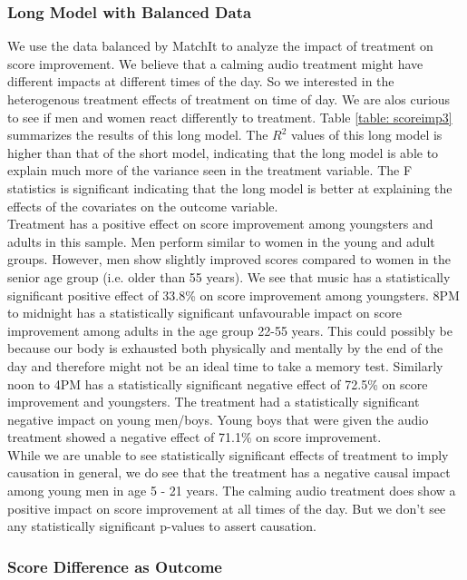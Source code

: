 \documentclass[journal,onecolumn, 12pt]{article}
\begin{document}
\subsubsection*{Long Model with Balanced Data} \label{longModel2}
We use the data balanced by MatchIt to analyze the impact of treatment on score improvement. We believe that a calming audio treatment might have different impacts at different times of the day. So we interested in the heterogenous treatment effects of treatment on time of day. We are alos curious to see if men and women react differently to treatment. Table \ref{table: scoreimp3} summarizes the results of this long model. 
The $R^2$ values of this long model is higher than that of the short model, indicating that the long model is able to explain much more of the variance seen in the treatment variable. The F statistics is significant indicating that the long model is better at explaining the effects of the covariates on the outcome variable. \\

\noindent
Treatment has a positive effect on score improvement among youngsters and adults in this sample. Men perform similar to women in the young and adult groups. However, men show slightly improved scores compared to women in the senior age group (i.e. older than 55 years). We see that music has a statistically significant positive effect of 33.8\% on score improvement among youngsters. 8PM to midnight has a statistically significant unfavourable impact on score improvement among adults in the age group 22-55 years. This could possibly be because our body is exhausted both physically and mentally by the end of the day and therefore might not be an ideal time to take a memory test. Similarly noon to 4PM has a statistically significant negative effect of 72.5\% on score improvement and youngsters. The treatment had a statistically significant negative impact on young men/boys. Young boys that were given the audio treatment showed a negative effect of 71.1\% on score improvement. \\

\noindent
While we are unable to see statistically significant effects of treatment to imply causation in general, we do see that the treatment has a negative causal impact among young men in age 5 - 21 years. The calming audio treatment does show a positive impact on score improvement at all times of the day. But we don't see any statistically significant p-values to assert causation. 

\subsubsection{Score Difference as Outcome}
\end{document}

